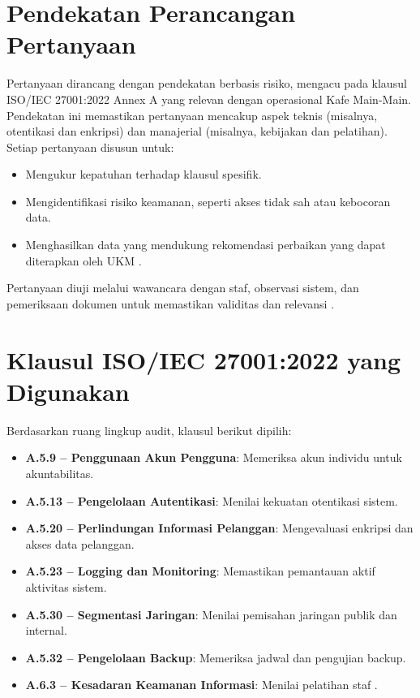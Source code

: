 \documentclass[12pt, a4paper]{report}
\begin{document}
\section{Pendekatan Perancangan Pertanyaan}
Pertanyaan dirancang dengan pendekatan berbasis risiko, mengacu pada klausul ISO/IEC 27001:2022 Annex A yang relevan dengan operasional Kafe Main-Main. Pendekatan ini memastikan pertanyaan mencakup aspek teknis (misalnya, otentikasi dan enkripsi) dan manajerial (misalnya, kebijakan dan pelatihan). Setiap pertanyaan disusun untuk:
\begin{itemize}
    \item Mengukur kepatuhan terhadap klausul spesifik.
    \item Mengidentifikasi risiko keamanan, seperti akses tidak sah atau kebocoran data.
    \item Menghasilkan data yang mendukung rekomendasi perbaikan yang dapat diterapkan oleh UKM \citep{rokhman2018implementasi}.
\end{itemize}
Pertanyaan diuji melalui wawancara dengan staf, observasi sistem, dan pemeriksaan dokumen untuk memastikan validitas dan relevansi \citep{permatasari2023manajemen}.

\section{Klausul ISO/IEC 27001:2022 yang Digunakan}
Berdasarkan ruang lingkup audit, klausul berikut dipilih:
\begin{itemize}
    \item \textbf{A.5.9 – Penggunaan Akun Pengguna}: Memeriksa akun individu untuk akuntabilitas.
    \item \textbf{A.5.13 – Pengelolaan Autentikasi}: Menilai kekuatan otentikasi sistem.
    \item \textbf{A.5.20 – Perlindungan Informasi Pelanggan}: Mengevaluasi enkripsi dan akses data pelanggan.
    \item \textbf{A.5.23 – Logging dan Monitoring}: Memastikan pemantauan aktif aktivitas sistem.
    \item \textbf{A.5.30 – Segmentasi Jaringan}: Menilai pemisahan jaringan publik dan internal.
    \item \textbf{A.5.32 – Pengelolaan Backup}: Memeriksa jadwal dan pengujian backup.
    \item \textbf{A.6.3 – Kesadaran Keamanan Informasi}: Menilai pelatihan staf \citep{iso27001, widodo2022keamanan}.
\end{itemize}
\end{document}
